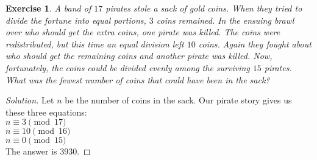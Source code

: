 \documentclass[12pt,leqno]{article}
\numberwithin{equation}{section}
\newtheorem{exer}[thm]{Exercise}
\theoremstyle{definition}
\begin{document}
\pagebreak
\begin{exer}
A band of $17$ pirates stole a sack of gold coins.  When they tried
to divide the fortune into equal portions, $3$ coins remained.  In
the ensuing brawl over who should get the extra coins, one pirate
was killed.  The coins were redistributed, but this time an equal
division left $10$ coins.  Again they fought about who should get
the remaining coins and another pirate was killed.  Now,
fortunately, the coins could be divided evenly among the surviving
$15$ pirates.  What was the fewest number of coins that could have
been in the sack?
\end{exer}

\begin{proof}[Solution]
Let $n$ be the number of coins in the sack.  Our pirate story gives us these three equations:\\
$n \equiv 3 \pmod{17}$\\
$n \equiv 10 \pmod{16}$\\
$n \equiv 0 \pmod{15}$ \\

The answer is 3930.

\end{proof}
\end{document}
